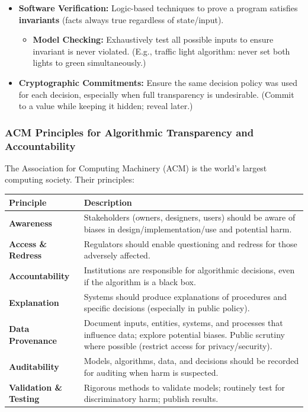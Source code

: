 \begin{keybox}
\begin{itemize}
  \item \textbf{Software Verification:} Logic-based techniques to prove a program satisfies \textbf{invariants} (facts always true regardless of state/input).
  \begin{itemize}
    \item \textbf{Model Checking:} Exhaustively test all possible inputs to ensure invariant is never violated. (E.g., traffic light algorithm: never set both lights to green simultaneously.)
  \end{itemize}
  \item \textbf{Cryptographic Commitments:} Ensure the same decision policy was used for each decision, especially when full transparency is undesirable. (Commit to a value while keeping it hidden; reveal later.)
\end{itemize}
\end{keybox}

\separator

\subsubsection{ACM Principles for Algorithmic Transparency and Accountability}

The Association for Computing Machinery (ACM) is the world's largest computing society. Their principles:

\begin{center}
\renewcommand{\arraystretch}{1.3}
\begin{tabular}{@{} l p{10cm} @{}}
\toprule
\textbf{Principle} & \textbf{Description} \\
\midrule
\textbf{Awareness} & Stakeholders (owners, designers, users) should be aware of biases in design/implementation/use and potential harm. \\
\textbf{Access \& Redress} & Regulators should enable questioning and redress for those adversely affected. \\
\textbf{Accountability} & Institutions are responsible for algorithmic decisions, even if the algorithm is a black box. \\
\textbf{Explanation} & Systems should produce explanations of procedures and specific decisions (especially in public policy). \\
\textbf{Data Provenance} & Document inputs, entities, systems, and processes that influence data; explore potential biases. Public scrutiny where possible (restrict access for privacy/security). \\
\textbf{Auditability} & Models, algorithms, data, and decisions should be recorded for auditing when harm is suspected. \\
\textbf{Validation \& Testing} & Rigorous methods to validate models; routinely test for discriminatory harm; publish results. \\
\bottomrule
\end{tabular}
\end{center}

